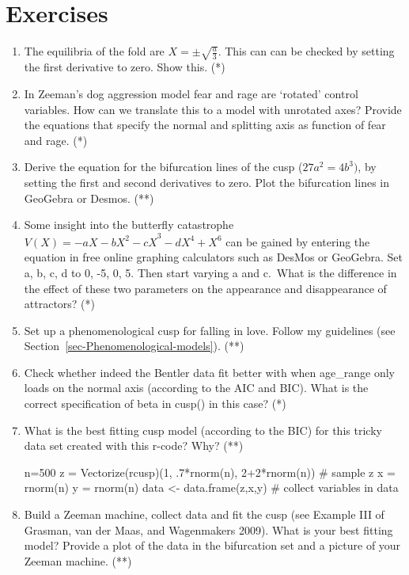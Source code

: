 \documentclass[
  a4paper,
  DIV=11,
  numbers=noendperiod]{scrreprt}
\newenvironment{Shaded}{\begin{snugshade}}{\end{snugshade}}
\newcommand{\CommentTok}[1]{\textcolor[rgb]{0.37,0.37,0.37}{#1}}
\newcommand{\DecValTok}[1]{\textcolor[rgb]{0.68,0.00,0.00}{#1}}
\newcommand{\FunctionTok}[1]{\textcolor[rgb]{0.28,0.35,0.67}{#1}}
\newcommand{\NormalTok}[1]{\textcolor[rgb]{0.00,0.23,0.31}{#1}}
\newcommand{\OtherTok}[1]{\textcolor[rgb]{0.00,0.23,0.31}{#1}}
\newcommand{\SpecialCharTok}[1]{\textcolor[rgb]{0.37,0.37,0.37}{#1}}
\begin{document}
\hypertarget{sec-Exercises}{%
\section{Exercises}\label{sec-Exercises}}

\begin{enumerate}
\def\labelenumi{\arabic{enumi})}
\item
  The equilibria of the fold are \(X = \pm \sqrt{\frac{a}{3}}\). This
  can can be checked by setting the first derivative to zero. Show this.
  (*)
\item
  In Zeeman's dog aggression model fear and rage are `rotated' control
  variables. How can we translate this to a model with unrotated axes?
  Provide the equations that specify the normal and splitting axis as
  function of fear and rage. (*)
\item
  Derive the equation for the bifurcation lines of the cusp
  (\(27a^{2} = 4b^{3})\), by setting the first and second derivatives to
  zero. Plot the bifurcation lines in GeoGebra or Desmos. (**)
\item
  Some insight into the butterfly catastrophe
  \(V(X) = {- aX - bX^{2} - cX}^{3} - dX^{4} + X^{6}\) can be gained by
  entering the equation in free online graphing calculators such as
  DesMos or GeoGebra. Set a, b, c, d to 0, -5, 0, 5. Then start varying
  a and c.~What is the difference in the effect of these two parameters
  on the appearance and disappearance of attractors? (*)
\item
  Set up a phenomenological cusp for falling in love. Follow my
  guidelines (see Section~\ref{sec-Phenomenological-models}). (**)
\item
  Check whether indeed the Bentler data fit better with when age\_range
  only loads on the normal axis (according to the AIC and BIC). What is
  the correct specification of beta in cusp() in this case? (*)
\item
  What is the best fitting cusp model (according to the BIC) for this
  tricky data set created with this r-code? Why? (**)

\begin{Shaded}
\begin{Highlighting}[]
\NormalTok{n}\OtherTok{=}\DecValTok{500}
\NormalTok{z }\OtherTok{=} \FunctionTok{Vectorize}\NormalTok{(rcusp)(}\DecValTok{1}\NormalTok{, .}\DecValTok{7}\SpecialCharTok{*}\FunctionTok{rnorm}\NormalTok{(n), }\DecValTok{2}\SpecialCharTok{+}\DecValTok{2}\SpecialCharTok{*}\FunctionTok{rnorm}\NormalTok{(n)) }\CommentTok{\# sample z }
\NormalTok{x }\OtherTok{=} \FunctionTok{rnorm}\NormalTok{(n) }
\NormalTok{y }\OtherTok{=} \FunctionTok{rnorm}\NormalTok{(n) }
\NormalTok{data }\OtherTok{\textless{}{-}} \FunctionTok{data.frame}\NormalTok{(z,x,y) }\CommentTok{\# collect variables in data}
\end{Highlighting}
\end{Shaded}
\item
  Build a Zeeman machine, collect data and fit the cusp (see Example III
  of Grasman, van der Maas, and Wagenmakers 2009). What is your best
  fitting model? Provide a plot of the data in the bifurcation set and a
  picture of your Zeeman machine. (**)
\end{enumerate}
\end{document}
